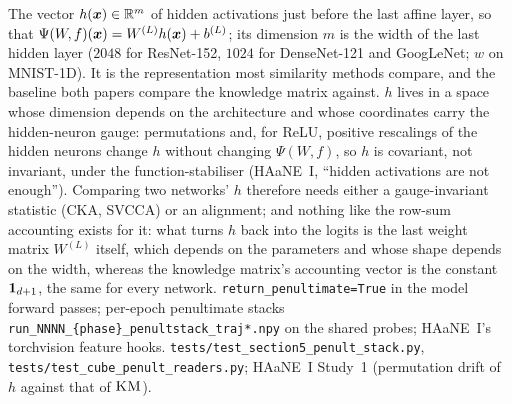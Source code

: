 {The vector $h(\boldsymbol{x})\in\mathbb{R}^m$ of hidden activations just before the last affine layer, so that $\Psi(W\!,f)(\boldsymbol{x})=W^{(L)}h(\boldsymbol{x})+b^{(L)}$; its dimension $m$ is the width of the last hidden layer ($2048$ for ResNet-152, $1024$ for DenseNet-121 and GoogLeNet; $w$ on MNIST-1D). It is the representation most similarity methods compare, and the baseline both papers compare the knowledge matrix against.}
{$h$ lives in a space whose dimension depends on the architecture and whose coordinates carry the hidden-neuron gauge: permutations and, for ReLU, positive rescalings of the hidden neurons change $h$ without changing $\Psi(W\!,f)$, so $h$ is covariant, not invariant, under the function-stabiliser (HAaNE~I, ``hidden activations are not enough''). Comparing two networks' $h$ therefore needs either a gauge-invariant statistic (CKA, SVCCA) or an alignment; and nothing like the row-sum accounting exists for it: what turns $h$ back into the logits is the last weight matrix $W^{(L)}$ itself, which depends on the parameters and whose shape depends on the width, whereas the knowledge matrix's accounting vector is the constant $\boldsymbol{1}_{d+1}$, the same for every network.}
{\texttt{return\_penultimate=True} in the model forward passes; per-epoch penultimate stacks \texttt{run\_NNNN\_\{phase\}\_penultstack\_traj*.npy} on the shared probes; HAaNE~I's torchvision feature hooks.}
{\texttt{tests/test\_section5\_penult\_stack.py}, \texttt{tests/test\_cube\_penult\_readers.py}; HAaNE~I Study~1 (permutation drift of $h$ against that of $\textsc{KM}$).}
